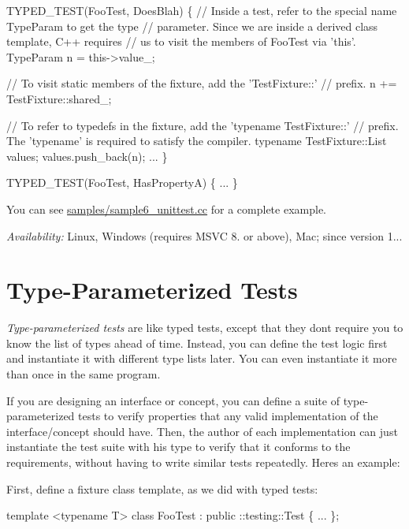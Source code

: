 \begin{DoxyCode}
TYPED\_TEST(FooTest, DoesBlah) \{
  // Inside a test, refer to the special name TypeParam to get the type
  // parameter.  Since we are inside a derived class template, C++ requires
  // us to visit the members of FooTest via 'this'.
  TypeParam n = this->value\_;

  // To visit static members of the fixture, add the 'TestFixture::'
  // prefix.
  n += TestFixture::shared\_;

  // To refer to typedefs in the fixture, add the 'typename TestFixture::'
  // prefix.  The 'typename' is required to satisfy the compiler.
  typename TestFixture::List values;
  values.push\_back(n);
  ...
\}

TYPED\_TEST(FooTest, HasPropertyA) \{ ... \}
\end{DoxyCode}


You can see {\ttfamily \hyperlink{sample6__unittest_8cc}{samples/sample6\+\_\+unittest.\+cc}} for a complete example.

{\itshape Availability\+:} Linux, Windows (requires M\+S\+VC 8. or above), Mac; since version 1...

\section*{Type-\/\+Parameterized Tests}

{\itshape Type-\/parameterized tests} are like typed tests, except that they don\textquotesingle{}t require you to know the list of types ahead of time. Instead, you can define the test logic first and instantiate it with different type lists later. You can even instantiate it more than once in the same program.

If you are designing an interface or concept, you can define a suite of type-\/parameterized tests to verify properties that any valid implementation of the interface/concept should have. Then, the author of each implementation can just instantiate the test suite with his type to verify that it conforms to the requirements, without having to write similar tests repeatedly. Here\textquotesingle{}s an example\+:

First, define a fixture class template, as we did with typed tests\+:


\begin{DoxyCode}
template <typename T>
class FooTest : public ::testing::Test \{
  ...
\};
\end{DoxyCode}


